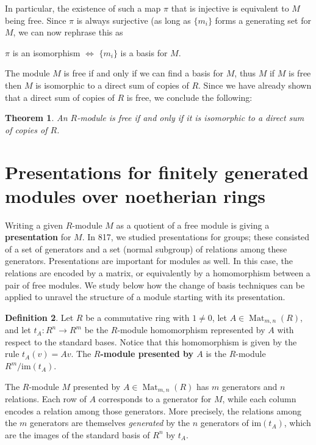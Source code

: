 \documentclass[12pt]{report}
\newtheorem{theorem}{Theorem}[chapter]
\numberwithin{equation}{section}
\numberwithin{theorem}{chapter}
\theoremstyle{definition}
\newtheorem{definition}[theorem]{Definition}
\newtheorem*{basic properties}{Basic Properties}
\newtheorem*{Important Remark}{Important Remark}
\newcommand{\df}[1]{{\bf #1}\index{#1}}
\DeclareMathOperator{\M}{Mat}
\begin{document}
In particular, the existence of such a map $\pi$ that is injective is equivalent to $M$ being free. Since $\pi$ is always surjective (as long as $\{ m_i \}$ forms a generating set for $M$, we can now rephrase this as
\begin{center}
	$\pi$ is an isomorphism $\iff$ $\{ m_i \}$ is a basis for $M$.
\end{center}

The module $M$ is free if and only if we can find a basis for $M$, thus $M$ if $M$ is free then $M$ is isomorphic to a direct sum of copies of $R$. Since we have already shown that a direct sum of copies of $R$ is free, we conclude the following:

\begin{theorem}
	An $R$-module is free if and only if it is isomorphic to a direct sum of copies of $R$.
\end{theorem}




\section{Presentations for finitely generated modules over noetherian rings}

Writing a given $R$-module $M$ as a quotient of a free module is giving a {\bf presentation} for $M$.
In 817, we studied presentations for groups; these consisted of a set of generators and a set (normal subgroup) of relations among these generators. Presentations are important for modules as well. In this case, the relations are encoded by a matrix, or equivalently by a homomorphism between a pair of free modules. We study below how the change of basis techniques can be applied to unravel the structure of a module starting with its presentation.


  
\begin{definition} 
Let $R$ be a commutative ring with $1 \neq 0$, let $A \in \M_{m,n}(R)$, and let $t_A\!: R^n \to R^m$ be the $R$-module homomorphism represented by $A$ with respect to the standard bases. Notice that this homomorphism is given by the rule $t_A(v)=Av$. The \df{$R$-module presented by $A$} is the $R$-module $R^m/\mathrm{im}(t_A)$.
 \end{definition}
 
 
The $R$-module $M$ presented by $A \in \M_{m,n}(R)$ has $m$ generators and $n$ relations. Each row of $A$ corresponds to a generator for $M$, while each column encodes a relation among those generators. More precisely, the relations among the $m$ generators are themselves \emph{generated} by the $n$ generators of $\mathrm{im}(t_A)$, which are the images of the standard basis of $R^n$ by $t_A$.
 
\end{document}
